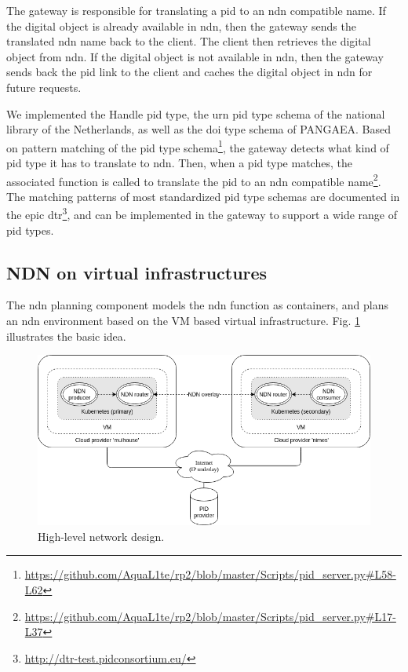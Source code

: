 \documentclass[conference]{IEEEtran}
\begin{document}
The gateway is responsible for translating a \gls{pid} to an \gls{ndn} compatible name. If the digital object is already available in \gls{ndn}, then the gateway sends the translated \gls{ndn} name back to the client. The client then retrieves the digital object from \gls{ndn}. If the digital object is not available in \gls{ndn}, then the gateway sends back the \gls{pid} link to the client and caches the digital object in \gls{ndn} for future requests.

We implemented the Handle \gls{pid} type, the \gls{urn} \gls{pid} type schema of the national library of the Netherlands, as well as the \gls{doi} type schema of PANGAEA. Based on pattern matching of the \gls{pid} type schema\footnote{\url{https://github.com/AquaL1te/rp2/blob/master/Scripts/pid_server.py#L58-L62}}, the gateway detects what kind of \gls{pid} type it has to translate to \gls{ndn}. Then, when a \gls{pid} type matches, the associated function is called to translate the \gls{pid} to an \gls{ndn} compatible name\footnote{\url{https://github.com/AquaL1te/rp2/blob/master/Scripts/pid_server.py#L17-L37}}. The matching patterns of most standardized \gls{pid} type schemas are documented in the \gls{epic} \gls{dtr}\footnote{\url{http://dtr-test.pidconsortium.eu/}}, and can be implemented in the gateway to support a wide range of \gls{pid} types. 

\subsection{NDN on virtual infrastructures}
The \gls{ndn} planning component models the \gls{ndn} function as containers, and plans an \gls{ndn} environment based on the VM based virtual infrastructure. Fig. \ref{fig:high-level-network-design} illustrates the basic idea.

\begin{figure}[H]
\centering
\includegraphics[width=\columnwidth]{images/high-level-network-design.png}
\caption{High-level network design.}
\label{fig:high-level-network-design}
\end{figure}
\end{document}

